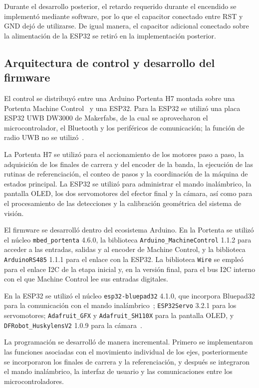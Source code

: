 Durante el desarrollo posterior, el retardo requerido durante el encendido se implementó mediante software, por lo que el capacitor conectado entre RST y GND dejó de utilizarse. De igual manera, el capacitor adicional conectado sobre la alimentación de la ESP32 se retiró en la implementación posterior.


\subsection{Arquitectura de control y desarrollo del firmware}

El control se distribuyó entre una Arduino Portenta H7 montada sobre una Portenta Machine Control~\cite{arduino2024portenta,arduinoMachineControl} y una ESP32. Para la ESP32 se utilizó una placa ESP32 UWB DW3000 de Makerfabs, de la cual se aprovecharon el microcontrolador, el Bluetooth y los periféricos de comunicación; la función de radio UWB no se utilizó~\cite{makerfabsesp32uwb}.

La Portenta H7 se utilizó para el accionamiento de los motores paso a paso, la adquisición de los finales de carrera y del encoder de la banda, la ejecución de las rutinas de referenciación, el conteo de pasos y la coordinación de la máquina de estados principal. La ESP32 se utilizó para administrar el mando inalámbrico, la pantalla OLED, los dos servomotores del efector final y la cámara, así como para el procesamiento de las detecciones y la calibración geométrica del sistema de visión.

El firmware se desarrolló dentro del ecosistema Arduino. En la Portenta se utilizó el núcleo \texttt{mbed\_portenta} 4.6.0, la biblioteca \texttt{Arduino\_MachineControl} 1.1.2 para acceder a las entradas, salidas y al encoder de Machine Control, y la biblioteca \texttt{ArduinoRS485} 1.1.1 para el enlace con la ESP32. La biblioteca \texttt{Wire} se empleó para el enlace I2C de la etapa inicial y, en la versión final, para el bus I2C interno con el que Machine Control lee sus entradas digitales.

En la ESP32 se utilizó el núcleo \texttt{esp32-bluepad32} 4.1.0, que incorpora Bluepad32 para la comunicación con el mando inalámbrico~\cite{bluepad32}; \texttt{ESP32Servo} 3.2.1 para los servomotores; \texttt{Adafruit\_GFX} y \texttt{Adafruit\_SH110X} para la pantalla OLED, y \texttt{DFRobot\_HuskylensV2} 1.0.9 para la cámara~\cite{dfrobotHuskylensLib}.

La programación se desarrolló de manera incremental. Primero se implementaron las funciones asociadas con el movimiento individual de los ejes, posteriormente se incorporaron los finales de carrera y la referenciación, y después se integraron el mando inalámbrico, la interfaz de usuario y las comunicaciones entre los microcontroladores.


